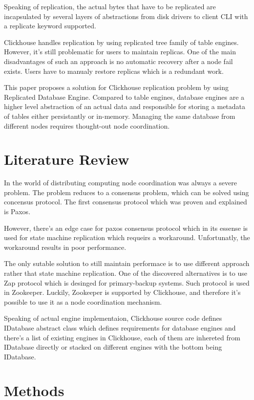 \documentclass[conference]{IEEEtran}
\begin{document}
Speaking of replication, the actual bytes that have to be replicated are incapsulated
by several layers of abstractions from disk drivers to client CLI with a replicate
keyword supported.

Clickhouse handles replication by using replicated tree family of table engines.
However, it's still problematic for users to maintain replicas. One of the
main disadvantages of such an approach is no automatic recovery after a node fail exists.
Users have to manualy restore replicas which is a redundant work.

This paper proposes a solution for Clickhouse replication problem by using Replicated
Database Engine. Compared to table engines, database engines are a higher level abstraction
of an actual data and responsible for storing a metadata of tables either persistantly or
in-memory. Managing the same database from different nodes requires thought-out node coordination.

\section{Literature Review}
In the world of distributing computing node coordination was
always a severe problem. The problem reduces to a consensus
problem, which can be solved using concensus protocol. The first consensus
protocol which was proven and explained is Paxos\cite{paxos}.

However, there's an edge case for paxos consensus protocol which in its essense is used for
state machine replication which requeirs a workaround\cite{zap}. Unfortunatly, the workaround
results in poor performance. 

The only sutable solution to still maintain performace is to use different approach
rather that state machine replication. One of the discovered alternatives is to use
Zap protocol which is desinged for primary-backup systems. Such protocol is used in
Zookeeper\cite{zookeeper}. Luckily, Zookeeper is supported by Clickhouse, and therefore
it's possible to use it as a node coordination mechanism.

Speaking of actual engine implementaion, Clickhouse source code\cite{clickhouse} defines IDatabase abstract class which defines
requirements for database engines and there's a list of existing engines in Clickhouse, each
of them are inhereted from IDatabase directly or stacked on different engines with the
bottom being IDatabase.

\section{Methods}
\end{document}
